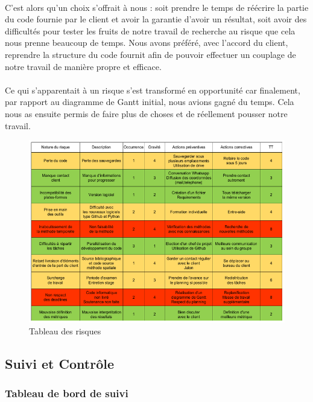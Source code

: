     \paragraph{}
    C'est alors qu'un choix s'offrait à nous : soit prendre le temps de réécrire la partie du code fournie par le client et avoir la garantie d'avoir un résultat, soit avoir des difficultés pour tester les fruits de notre travail de recherche au risque que cela nous prenne beaucoup de temps. Nous avons préféré, avec l'accord du client, reprendre la structure du code fournit afin de pouvoir effectuer un couplage de notre travail de manière propre et efficace.

    \paragraph{}
    Ce qui s'apparentait à un risque s'est transformé en opportunité car finalement, par rapport au diagramme de Gantt initial, nous avions gagné du temps. Cela nous as ensuite permis de faire plus de choses et de réellement pousser notre travail.
    \begin{figure}
        \centering
        \includegraphics[width=\textwidth]{images/matrice_risque.png}
        \caption{Tableau des risques}
        \label{Tab risque}
    \end{figure}


\subsection{Suivi et Contrôle}

    \subsubsection{Tableau de bord de suivi}
